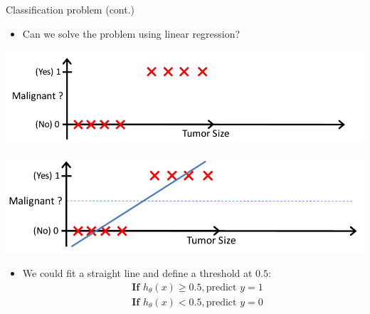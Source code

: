 \documentclass[serif, aspectratio=169]{beamer}
\begin{document}
\begin{frame}{Classification problem (cont.)}
    \begin{itemize}
        \item Can we solve the problem using linear regression?
    \end{itemize}
    
    \begin{minipage}{0.48\linewidth}
        \centering
        \includegraphics[width=\linewidth]{pic/lrClassification1.png}
    \end{minipage}
    \hfill
    \begin{minipage}{0.48\linewidth}
        \centering
        \includegraphics[width=\linewidth]{pic/lrClassification3.png}
    \end{minipage}
    
    \begin{itemize}
        \item We could fit a straight line and define a threshold at $0.5$:
            \begin{align*}
                & \textbf{If  } h_\theta (x) \geq 0.5, \text{predict  } y=1 \\
                & \textbf{If  } h_\theta (x) < 0.5, \text{predict  } y=0
            \end{align*}
    \end{itemize}
\end{frame}
\end{document}
